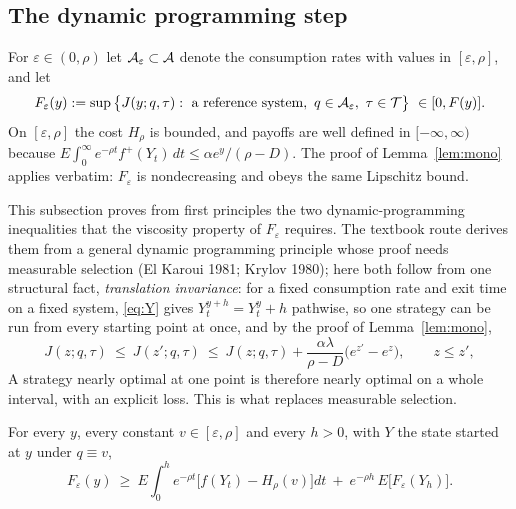 \subsection{The dynamic programming step}

For $\varepsilon\in(0,\rho)$ let $\mathcal{A}_\varepsilon\subset\mathcal{A}$ denote the consumption rates with values in $[\varepsilon,\rho]$, and let
\[
F_\varepsilon(y):=\sup\big\{J(y;q,\tau):\ \text{a reference system},\ q\in\cA_\varepsilon,\ \tau\in\cT\big\}\ \in[0,F(y)].
\]
On $[\varepsilon,\rho]$ the cost $H_\rho$ is bounded, and payoffs are well defined in $[-\infty,\infty)$ because $E\int_0^\infty e^{-\rho t}f^+(Y_t)\,dt\le\alpha e^y/(\rho-D)$. The proof of Lemma~\ref{lem:mono} applies verbatim: $F_\varepsilon$ is nondecreasing and obeys the same Lipschitz bound.

This subsection proves from first principles the two dynamic-programming inequalities that the viscosity property of $F_\varepsilon$ requires. The textbook route derives them from a general dynamic programming principle whose proof needs measurable selection (El Karoui 1981; Krylov 1980); here both follow from one structural fact, \emph{translation invariance}: for a fixed consumption rate and exit time on a fixed system, \eqref{eq:Y} gives $Y^{y+h}_t=Y^y_t+h$ pathwise, so one strategy can be run from every starting point at once, and by the proof of Lemma~\ref{lem:mono},
\begin{equation}
J(z;q,\tau)\ \le\ J(z';q,\tau)\ \le\ J(z;q,\tau)+\frac{\alpha\lambda}{\rho-D}\big(e^{z'}-e^{z}\big),\qquad z\le z' , \label{eq:transplant}
\end{equation}
A strategy nearly optimal at one point is therefore nearly optimal on a whole interval, with an explicit loss. This is what replaces measurable selection.

\begin{alemma}[Pasting]\label{lem:paste}
For every $y$, every constant $v\in[\varepsilon,\rho]$ and every $h>0$, with $Y$ the state started at $y$ under $q\equiv v$,
\[
F_\varepsilon(y)\ \ge\ E\int_0^h e^{-\rho t}\big[f(Y_t)-H_\rho(v)\big]dt\ +\ e^{-\rho h}\,E\big[F_\varepsilon(Y_h)\big].
\]
\end{alemma}

